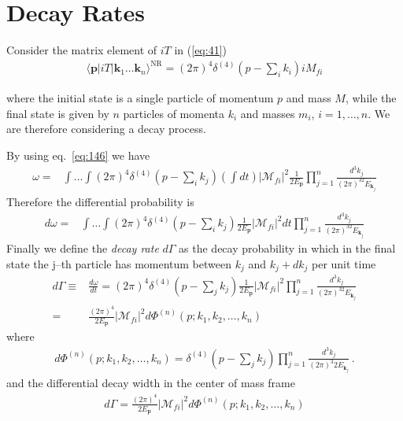 \section{Decay Rates}
\label{sec:decay-rates}
Consider the matrix element of $i T$ in (\ref{eq:41})
\begin{align}
  \label{eq:45}
  \langle\mathbf{p}|i T|\mathbf{k}_1\ldots\mathbf{k}_n\rangle^{\text{NR}}=(2\pi)^4\delta^{(4)}\left(p-\sum_i k_i\right)i{M}_{fi}
\end{align}

where the initial state is a single particle of momentum $p$ and mass $M$, while the final state is given by $n$ particles of momenta $k_i$ and masses $m_i$, $i=1,\ldots,n$. 
We are therefore considering a decay process. 


By using eq.~\eqref{eq:146} we have
\begin{align}
\omega=&\int\ldots\int 
(2\pi)^4\delta^{(4)}\left(p-\sum_i k_j\right)\left(\int dt\right) 
\left|\mathcal{M}_{fi}\right|^2
\frac{1}{2E_{\mathbf{p}}}
\prod_{j=1}^n\frac{d^3k_j}{(2\pi)^32E_{\mathbf{k}_j}}
\end{align}
Therefore the differential probability is
\begin{align}
  d\omega=&\int\ldots\int 
(2\pi)^4\delta^{(4)}\left(p-\sum_i k_j\right)
\frac{1}{2E_{\mathbf{p}}}\left|\mathcal{M}_{fi}\right|^2
dt\prod_{j=1}^n\frac{d^3k_j}{(2\pi)^32E_{\mathbf{k}_j}}
\end{align}
Finally we define the \textit{decay rate} $d\Gamma$ as the decay probability in which in the final state
the j--th particle has momentum between $k_j$ and $k_j+ dk_j$ per unit time
\begin{align}
\label{eq:49}
d\Gamma\equiv&\frac{d\omega}{dt}=
(2\pi)^4\delta^{(4)}\left(p-\sum_j k_j\right)
\frac{1}{2E_{\mathbf{p}}}\left|\mathcal{M}_{fi}\right|^2
\prod_{j=1}^n\frac{d^3k_j}{(2\pi)^32E_{\mathbf{k}_j}}\nonumber\\
=&\frac{(2\pi)^4}{2E_{\mathbf{p}}}\left|\mathcal{M}_{fi}\right|^2
d \Phi^{(n)} (p; k_1, k_2,\dots, k_n)
\end{align}
where
\begin{align}
  \label{eq:50}
    d \Phi^{(n)} (p; k_1, k_2,\dots, k_n) = \delta^{(4)}\left(p-\sum_j k_j\right)  \prod_{j=1}^n \frac{d^3 k_j}{(2\pi)^3 2 E_{\mathbf{k}_j}} \,.
\end{align}
and the differential decay width in the center of mass frame
\begin{align}
  \label{eq:51}
  d\Gamma=\frac{(2\pi)^4}{2E_{\mathbf{p}}}\left|\mathcal{M}_{fi}\right|^2
d \Phi^{(n)} (p; k_1, k_2,\dots, k_n)
\end{align}

